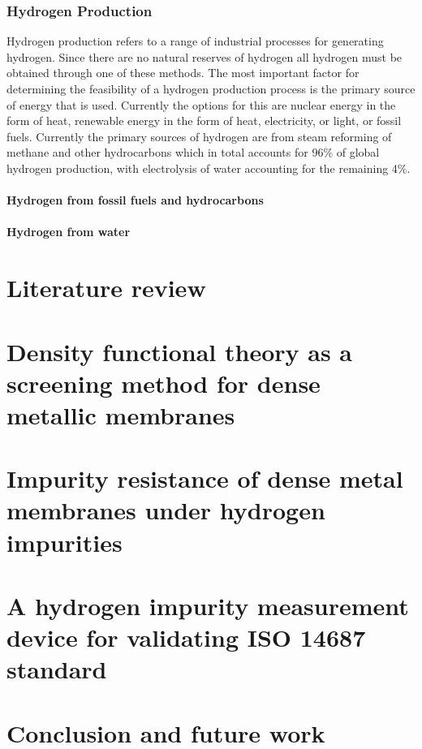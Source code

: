\documentclass{report}
\begin{document}
\subsection{Hydrogen Production}
Hydrogen production refers to a range of industrial processes for generating hydrogen. Since there are no natural reserves of hydrogen all hydrogen must be obtained through one of these methods. The most important factor for determining the feasibility of a hydrogen production process is the primary source of energy that is used. Currently the options for this are nuclear energy in the form of heat, renewable energy in the form of heat, electricity, or light, or fossil fuels. Currently the primary sources of hydrogen are from steam reforming of methane and other hydrocarbons which in total accounts for 96\% of global hydrogen production, with electrolysis of water accounting for the remaining 4\%.
\subsubsection{Hydrogen from fossil fuels and hydrocarbons}

\subsubsection{Hydrogen from water}

\chapter{Literature review}

\chapter{Density functional theory as a screening method for dense metallic membranes}

\chapter{Impurity resistance of dense metal membranes under hydrogen impurities}

\chapter{A hydrogen impurity measurement device for validating ISO 14687 standard}

\chapter{Conclusion and future work}
\end{document}
